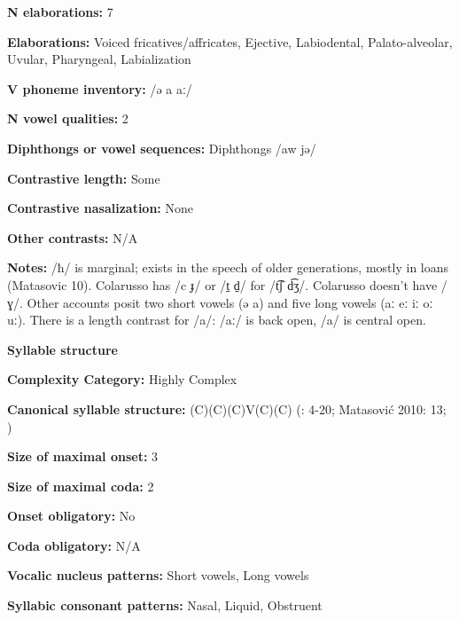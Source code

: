 \textbf{N elaborations:} 7



\textbf{Elaborations:} Voiced fricatives/affricates, Ejective, Labiodental, Palato-alveolar, Uvular, Pharyngeal, Labialization



\textbf{V phoneme inventory:} /ə a aː/



\textbf{N vowel qualities:} 2



\textbf{Diphthongs or vowel sequences:} Diphthongs /aw jə/



\textbf{Contrastive length:} Some



\textbf{Contrastive nasalization:} None



\textbf{Other contrasts:} N/A



\textbf{Notes:} /ħ/ is marginal; exists in the speech of older generations, mostly in  loans (Matasovic 10). Colarusso has /c ɟ/ or /t̠ d̠/ for /t͡ʃ d͡ʒ/. Colarusso doesn’t have /ɣ/. Other accounts posit two short vowels (ə a) and five long vowels (aː eː iː oː uː). There is a length contrast for /a/: /aː/ is back open, /a/ is central open.



\textbf{Syllable structure}



\textbf{Complexity Category:} Highly Complex



\textbf{Canonical syllable structure:} (C)(C)(C)V(C)(C) (\citealt{Colarusso2006}: 4-20; Matasović 2010: 13; \citealt{Applebaum2013})



\textbf{Size of maximal onset:} 3



\textbf{Size of maximal coda:} 2



\textbf{Onset obligatory:} No



\textbf{Coda obligatory:} N/A



\textbf{Vocalic nucleus patterns:} Short vowels, Long vowels



\textbf{Syllabic consonant patterns:} Nasal, Liquid, Obstruent



